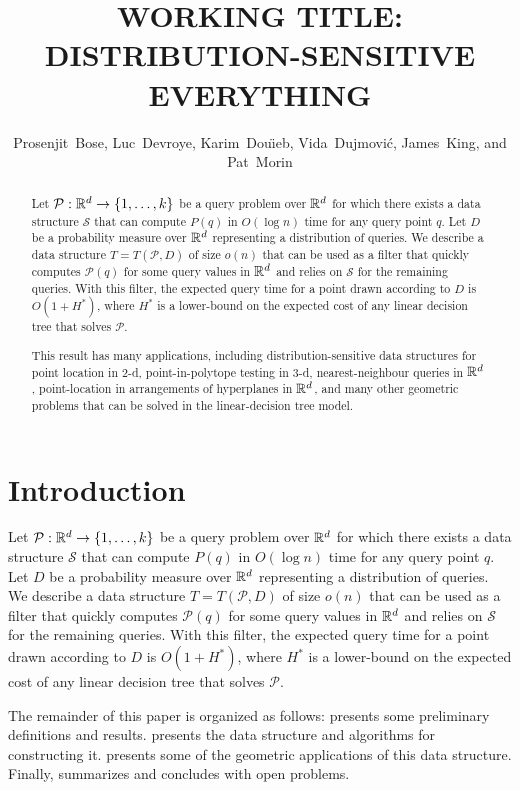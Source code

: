 \documentclass{patmorin}
\title{\MakeUppercase{Working Title: Distribution-Sensitive Everything}}
\author{Prosenjit~Bose, 
        Luc~Devroye,
	Karim~Dou\"{\i}eb, 
	Vida~Dujmovi\'c, 
	James~King, and 
	Pat~Morin}
\begin{document}
\maketitle

\begin{abstract}
Let $\mathcal{P}:\mathbb{R}^d\rightarrow\{1,\ldots,k\}$ be a query problem over
$\mathbb{R}^d$ for which there exists a data structure $\mathcal{S}$ that can
compute $P(q)$ in $O(\log n)$ time for any query point $q$.  Let $D$ be
a probability measure over $\mathbb{R}^d$ representing a distribution of queries.
We describe a data structure $T=T(\mathcal{P},D)$ of size $o(n)$ that can
be used as a filter that quickly computes $\mathcal{P}(q)$ for some query
values in $\mathbb{R}^d$ and relies on $\mathcal{S}$ for the remaining queries.
With this filter, the expected query time for a point drawn according
to $D$ is $O(1+ H^*)$, where $H^*$ is a lower-bound on the expected cost
of any linear decision tree that solves $\mathcal{P}$.

This result has many applications, including distribution-sensitive data
structures for point location in 2-d, point-in-polytope testing in 3-d,
nearest-neighbour queries in $\mathbb{R}^d$, point-location in arrangements of
hyperplanes in $\mathbb{R}^d$, and many other geometric problems that can be
solved in the linear-decision tree model.
\end{abstract}

\section{Introduction}

Let $\mathcal{P}:\mathbb{R}^d\rightarrow\{1,\ldots,k\}$ be a query problem over
$\mathbb{R}^d$ for which there exists a data structure $\mathcal{S}$ that can
compute $P(q)$ in $O(\log n)$ time for any query point $q$.  Let $D$ be
a probability measure over $\mathbb{R}^d$ representing a distribution of queries.
We describe a data structure $T=T(\mathcal{P},D)$ of size $o(n)$ that can
be used as a filter that quickly computes $\mathcal{P}(q)$ for some query
values in $\mathbb{R}^d$ and relies on $\mathcal{S}$ for the remaining queries.
With this filter, the expected query time for a point drawn according
to $D$ is $O(1+ H^*)$, where $H^*$ is a lower-bound on the expected cost
of any linear decision tree that solves $\mathcal{P}$.

The remainder of this paper is organized as follows: 
presents some preliminary definitions and results. 
presents the data structure and algorithms for constructing it.
 presents some of the geometric applications of this
data structure. Finally,  summarizes and concludes
with open problems.
\end{document}
